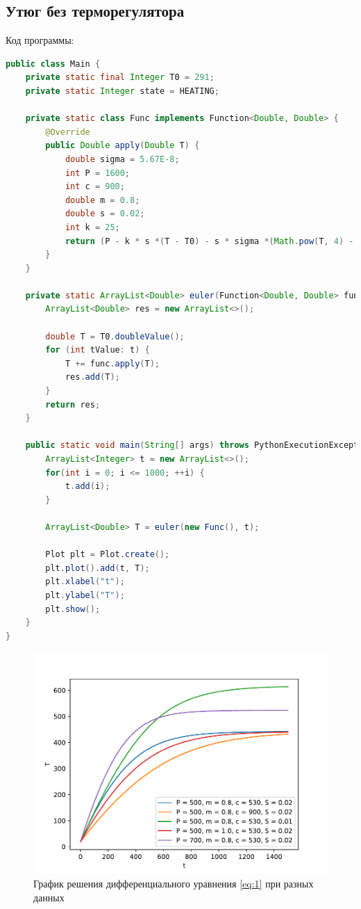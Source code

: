 \documentclass[a4paper, 14pt]{extarticle}
\begin{document}
		\subsection{Утюг без терморегулятора}
			Код программы:
			\begin{lstlisting}[language=Java]
public class Main {
	private static final Integer T0 = 291;
	private static Integer state = HEATING;
	
	private static class Func implements Function<Double, Double> {
		@Override
		public Double apply(Double T) {
			double sigma = 5.67E-8;
			int P = 1600;
			int c = 900;
			double m = 0.8;
			double s = 0.02;
			int k = 25;
			return (P - k * s *(T - T0) - s * sigma *(Math.pow(T, 4) - Math.pow(T0, 4))) / c * m;
		}
	}
	
	private static ArrayList<Double> euler(Function<Double, Double> func, ArrayList<Integer> t) {
		ArrayList<Double> res = new ArrayList<>();
		
		double T = T0.doubleValue();
		for (int tValue: t) {
			T += func.apply(T);
			res.add(T);
		}
		return res;
	}
	
	public static void main(String[] args) throws PythonExecutionException, IOException {
		ArrayList<Integer> t = new ArrayList<>();
		for(int i = 0; i <= 1000; ++i) {
			t.add(i);
		}
		
		ArrayList<Double> T = euler(new Func(), t);
		
		Plot plt = Plot.create();
		plt.plot().add(t, T);
		plt.xlabel("t");
		plt.ylabel("T");
		plt.show();
	}
}
			\end{lstlisting}
			\begin{figure}[H]
				\centering
				\includegraphics[width = \linewidth]{fig1.pdf}
				\caption[.] {График решения дифференциального уравнения \eqref{eq:1} при разных данных}
			\end{figure}
		\pagebreak
\end{document}
